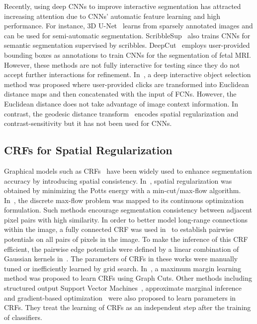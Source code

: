 \documentclass[10pt,journal,compsoc]{IEEEtran}
\begin{document}
Recently, using deep CNNs to improve interactive segmentation has attracted increasing attention due to CNNs' automatic feature learning  and high performance.  For instance, 3D U-Net~\cite{Abdulkadir2016} learns from sparsely annotated images and can be used for semi-automatic segmentation. ScribbleSup~\cite{Lin2016} also trains CNNs for semantic segmentation supervised by scribbles. DeepCut~\cite{Rajchl2016} employs user-provided bounding boxes as annotations to train CNNs for the segmentation of fetal MRI. However, these methods are not fully interactive for testing since they do not accept further interactions for refinement. In~\cite{Xu2016}, a deep interactive object selection method was proposed where user-provided clicks are transformed into Euclidean distance maps and then concatenated with the input of FCNs. However, the Euclidean distance does not take advantage of image context information. In contrast, the geodesic distance transform~\cite{Bai2007, Criminisi2008, Kohli2013} encodes spatial regularization and contrast-sensitivity but it has not been used for CNNs.  %


\subsection{CRFs for Spatial Regularization}
Graphical models such as CRFs~\cite{Boykov2004,Yuan2010,Chen2015iclr} have been widely used to enhance segmentation accuracy by introducing spatial consistency. In~\cite{Boykov2004}, spatial regularization was obtained by minimizing the Potts energy with a min-cut/max-flow algorithm. In~\cite{Yuan2010}, the discrete max-flow problem was mapped to its continuous optimization formulation. Such methods encourage segmentation consistency between adjacent pixel pairs with high similarity.  In order to better model long-range connections within the image, a fully connected CRF was used in~\cite{Payet2010} to establish pairwise potentials on all pairs of pixels in the image. To make the inference of this CRF efficient, the pairwise edge potentials were defined by a linear combination of Gaussian kernels in~\cite{Krahenbuhl2011}. The parameters of CRFs in these works were manually tuned or inefficiently learned by grid search.  
In~\cite{Szummer2008}, a maximum margin learning method was proposed to learn CRFs using Graph Cuts. Other methods including structured output Support Vector Machines~\cite{Blaschko2014}, approximate marginal inference~\cite{Domke2013} and gradient-based optimization~\cite{Krahenbuhl2013a} were also proposed to learn parameters in CRFs. They treat the learning of CRFs as an independent step after the training of classifiers.
\end{document}
